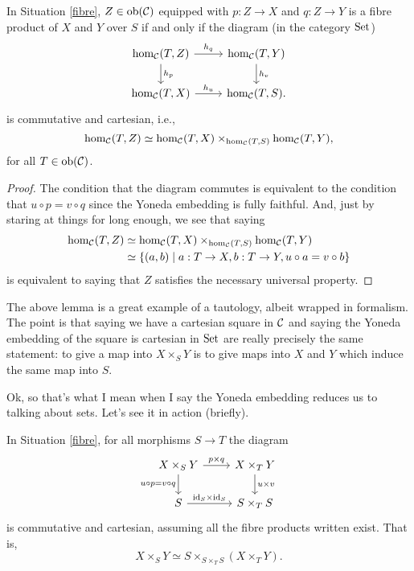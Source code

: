 \begin{lemma}
  \label{magic}
  In Situation \ref{fibre}, $Z \in {\operatorname{\textup{ob}}}(\mathcal{C})$ equipped with $p : Z \to
  X$ and $q : Z \to Y$ is a fibre product of $X$ and $Y$ over $S$ if
  and only if the diagram (in the category ${\operatorname{\textup{Set}}}$)
  \[
  \begin{tikzcd}
    \hom_\C(T, Z) \rar{h_q} \dar{h_p} & \hom_\C(T, Y) \dar{h_v}
    \\ \hom_\C(T,X) \rar{h_u} & \hom_\C(T,S).
  \end{tikzcd}
  \]
  is commutative and cartesian, i.e.,
  \[
  {\operatorname{\textup{hom}}}_{\mathcal{C}}(T,Z) \simeq {\operatorname{\textup{hom}}}_{\mathcal{C}}(T,X) \times_{{\operatorname{\textup{hom}}}_{\mathcal{C}}(T,S)}
  {\operatorname{\textup{hom}}}_{\mathcal{C}}(T,Y),
  \]
  for all $T \in {\operatorname{\textup{ob}}}(\mathcal{C})$.
\end{lemma}

\begin{proof}
  The condition that the diagram commutes is equivalent to the
  condition that $u \circ p = v \circ q$ since the Yoneda embedding is
  fully faithful. And, just by staring at things for long enough, we
  see that saying
  \begin{align*}
  {\operatorname{\textup{hom}}}_{\mathcal{C}}(T,Z) &\simeq {\operatorname{\textup{hom}}}_{\mathcal{C}}(T,X) \times_{{\operatorname{\textup{hom}}}_{\mathcal{C}}(T,S)} {\operatorname{\textup{hom}}}_{\mathcal{C}}(T,Y)
  \\ &\simeq \{(a, b) \mid a : T \to X, b : T \to Y, u \circ a = v
  \circ b\}
  \end{align*}
  is equivalent to saying that $Z$ satisfies the necessary universal
  property.
\end{proof}

\begin{remark}
  The above lemma is a great example of a tautology, albeit wrapped in
  formalism. The point is that saying we have a cartesian square in
  $\mathcal{C}$ and saying the Yoneda embedding of the square is cartesian in
  ${\operatorname{\textup{Set}}}$ are really precisely the same statement: to give a map into
  $X \times_S Y$ is to give maps into $X$ and $Y$ which induce the
  same map into $S$.
\end{remark}

Ok, so that's what I mean when I say the Yoneda embedding reduces us
to talking about sets. Let's see it in action (briefly).

\begin{lemma}
  In Situation \ref{fibre}, for all morphisms $S \to T$ the diagram
  \[
  \begin{tikzcd}
    X \times_S Y \rar{p \times q} \ar{d}[left]{u \circ p = v \circ q}
    & X \times_T Y \dar{u \times v} \\ S \rar{\id_S \times \id_S} & S
    \times_T S
  \end{tikzcd}
  \]
  is commutative and cartesian, assuming all the fibre products
  written exist. That is,
  \[
  X \times_S Y \simeq S \times_{S \times_T S} (X \times_T Y).
  \]
\end{lemma}

